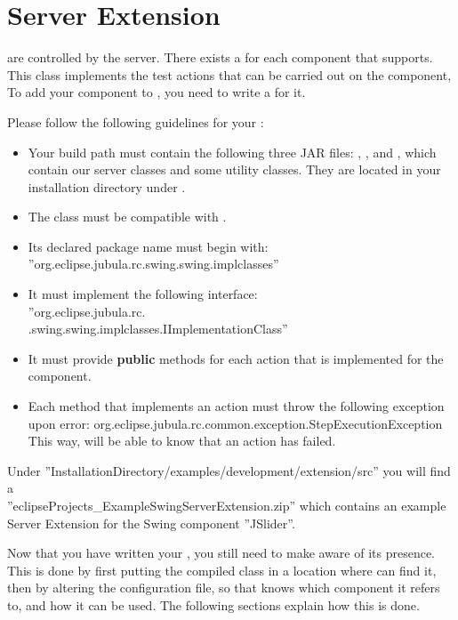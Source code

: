 \section{\app{} Server Extension}

\gdauts{} are controlled by the server. There exists a \gdtesterclass for each component that
\app{} supports. This class implements the test actions that can be carried out on the component, To add your
component to \app{}, you need to write a \gdtesterclass for it.

Please follow the following guidelines for your \gdtesterclasses:
\begin{itemize}
  \item Your build path must contain the following three JAR files:
  , , and
  , which contain our server classes and some utility classes. They are located in your \app{} installation directory under
  .
  \item The class must be compatible with .
  \item Its declared package name must begin with: \\
    ''org.eclipse.jubula.rc.swing.swing.implclasses''
  \item It must implement the following interface: \\
    ''org.eclipse.jubula.rc.\\.swing.swing.implclasses.IImplementationClass''
  \item It must provide \textbf{public} methods for each action that is implemented for the component.
  \item Each method that implements an action must throw the following exception upon error:
    org.eclipse.jubula.rc.common.exception.StepExecutionException
    This way, \app{} will be able to know that an action has failed.
\end{itemize}

Under ''InstallationDirectory/examples/development/extension/src''
you will find a \\ ''eclipseProjects\_ExampleSwingServerExtension.zip'' which contains
 an example \app{} Server Extension for the Swing component ''JSlider''.

Now that you have written your \gdtesterclass, you still need to
make \app{} aware of its presence. This is done by first putting the
compiled class in a
location where \app{} can find it, then by altering the configuration
file, so that \app{} knows which component it refers to, and how it can
be used. The following sections explain how this is done.

